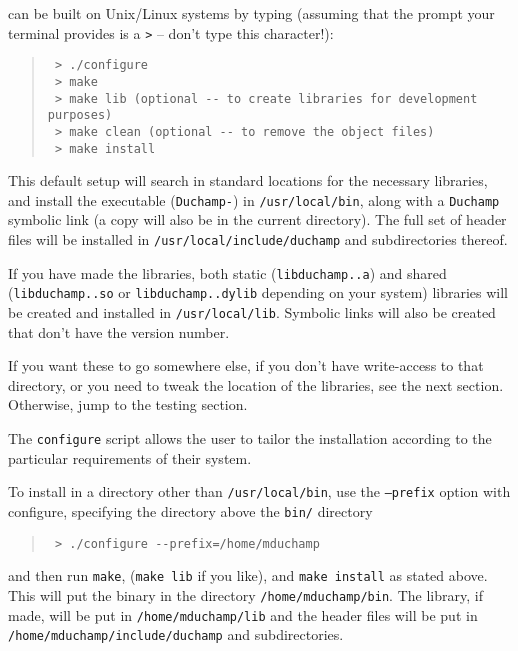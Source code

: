 
\duchamp can be built on Unix/Linux systems by typing (assuming that
the prompt your terminal provides is a \verb|>| -- don't type this
character!):
\begin{quote}
{\footnotesize
\begin{verbatim}
 > ./configure
 > make
 > make lib (optional -- to create libraries for development purposes)
 > make clean (optional -- to remove the object files)
 > make install 
\end{verbatim}
}
\end{quote}

This default setup will search in standard locations for the necessary
libraries, and install the executable (\texttt{Duchamp-\version}) in
\texttt{/usr/local/bin}, along with a \texttt{Duchamp} symbolic link
(a copy will also be in the current directory). The full set of header
files will be installed in \texttt{/usr/local/include/duchamp} and
subdirectories thereof. 

If you have made the libraries, both static
(\texttt{libduchamp.\version.a}) and shared
(\texttt{libduchamp.\version.so} or \texttt{libduchamp.\version.dylib}
depending on your system) libraries will be created and installed in
\texttt{/usr/local/lib}. Symbolic links will also be created that
don't have the version number.

If you want these to go somewhere else, \eg if you don't have
write-access to that directory, or you need to tweak the location of
the libraries, see the next section. Otherwise, jump to the testing
section.


The \texttt{configure} script allows the user to tailor the
installation according to the particular requirements of their
system. 

To install \duchamp in a directory other than \texttt{/usr/local/bin},
use the \texttt{--prefix} option with configure, specifying the
directory above the \texttt{bin/} directory \eg
\begin{quote}
{\footnotesize
\verb| > ./configure --prefix=/home/mduchamp|
}
\end{quote}
and then run \texttt{make}, (\texttt{make lib} if you like), and
\texttt{make install} as stated above. This will put the binary in the
directory \texttt{/home/mduchamp/bin}. The library, if made, will be
put in \texttt{/home/mduchamp/lib} and the header files will be put in
\texttt{/home/mduchamp/include/duchamp} and subdirectories.

